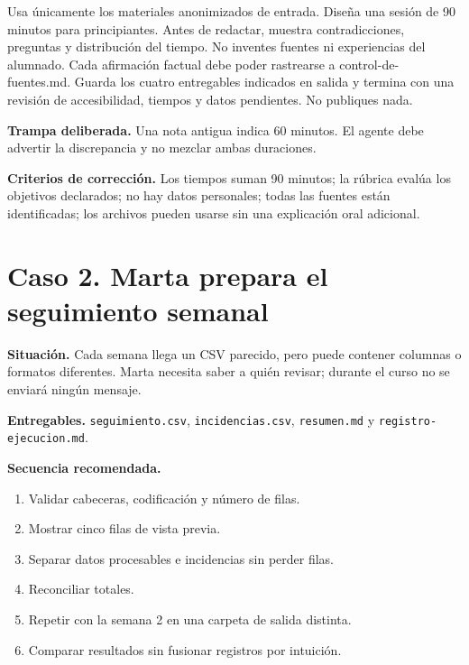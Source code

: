 \documentclass[10pt,a4paper,openany]{book}
\providecommand{\tightlist}{\setlength{\itemsep}{0.18em}\setlength{\parskip}{0pt}}
\newenvironment{Shaded}{}{}
\newcommand{\NormalTok}[1]{#1}
\renewenvironment{Shaded}
  {\begin{tcolorbox}[
    enhanced,
    breakable,
    colback=CodeBg,
    colframe=Border,
    boxrule=0.5pt,
    arc=2mm,
    left=3mm,
    right=3mm,
    top=2.2mm,
    bottom=2.2mm,
    before skip=0.8em,
    after skip=0.9em
  ]}
  {\end{tcolorbox}}
\begin{document}
\begin{Shaded}
\begin{Highlighting}[]
\NormalTok{Usa únicamente los materiales anonimizados de entrada. Diseña una sesión de}
\NormalTok{90 minutos para principiantes. Antes de redactar, muestra contradicciones,}
\NormalTok{preguntas y distribución del tiempo. No inventes fuentes ni experiencias del}
\NormalTok{alumnado. Cada afirmación factual debe poder rastrearse a control{-}de{-}fuentes.md.}
\NormalTok{Guarda los cuatro entregables indicados en salida y termina con una revisión}
\NormalTok{de accesibilidad, tiempos y datos pendientes. No publiques nada.}
\end{Highlighting}
\end{Shaded}

\begin{warningbox}

\textbf{Trampa deliberada.} Una nota antigua indica 60 minutos. El
agente debe advertir la discrepancia y no mezclar ambas duraciones.

\end{warningbox}

\begin{successbox}

\textbf{Criterios de corrección.} Los tiempos suman 90 minutos; la
rúbrica evalúa los objetivos declarados; no hay datos personales; todas
las fuentes están identificadas; los archivos pueden usarse sin una
explicación oral adicional.

\end{successbox}

\section{Caso 2. Marta prepara el seguimiento
semanal}\label{caso-2.-marta-prepara-el-seguimiento-semanal}

\textbf{Situación.} Cada semana llega un CSV parecido, pero puede
contener columnas o formatos diferentes. Marta necesita saber a quién
revisar; durante el curso no se enviará ningún mensaje.

\textbf{Entregables.} \texttt{seguimiento.csv},
\texttt{incidencias.csv}, \texttt{resumen.md} y
\texttt{registro-ejecucion.md}.

\textbf{Secuencia recomendada.}

\begin{enumerate}
\def\labelenumi{\arabic{enumi}.}
\tightlist
\item
  Validar cabeceras, codificación y número de filas.
\item
  Mostrar cinco filas de vista previa.
\item
  Separar datos procesables e incidencias sin perder filas.
\item
  Reconciliar totales.
\item
  Repetir con la semana 2 en una carpeta de salida distinta.
\item
  Comparar resultados sin fusionar registros por intuición.
\end{enumerate}
\end{document}
